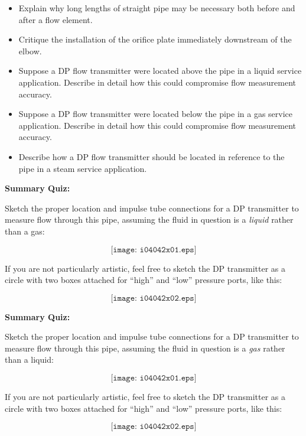\begin{itemize}
\item{} Explain why long lengths of straight pipe may be necessary both before and after a flow element.
\item{} Critique the installation of the orifice plate immediately downstream of the elbow.
\item{} Suppose a DP flow transmitter were located above the pipe in a liquid service application.  Describe in detail how this could compromise flow measurement accuracy.
\item{} Suppose a DP flow transmitter were located below the pipe in a gas service application.  Describe in detail how this could compromise flow measurement accuracy.
\item{} Describe how a DP flow transmitter should be located in reference to the pipe in a steam service application.
\end{itemize}













\vfil \eject

\noindent
{\bf Summary Quiz:}

Sketch the proper location and impulse tube connections for a DP transmitter to measure flow through this pipe, assuming the fluid in question is a {\it liquid} rather than a gas:

\vskip 75pt

$$\texttt{[image: i04042x01.eps]}$$

\vskip 75pt

If you are not particularly artistic, feel free to sketch the DP transmitter as a circle with two boxes attached for ``high'' and ``low'' pressure ports, like this:

$$\texttt{[image: i04042x02.eps]}$$











\vfil \eject

\noindent
{\bf Summary Quiz:}

Sketch the proper location and impulse tube connections for a DP transmitter to measure flow through this pipe, assuming the fluid in question is a {\it gas} rather than a liquid:

\vskip 75pt

$$\texttt{[image: i04042x01.eps]}$$

\vskip 75pt

If you are not particularly artistic, feel free to sketch the DP transmitter as a circle with two boxes attached for ``high'' and ``low'' pressure ports, like this:

$$\texttt{[image: i04042x02.eps]}$$





